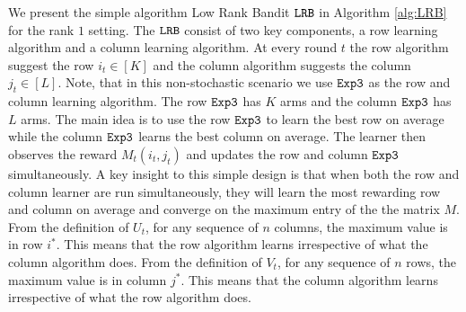 


%

We present the simple  algorithm Low Rank Bandit ${\tt LRB}$  in Algorithm \ref{alg:LRB} for the rank $1$ setting. The ${\tt LRB}$ consist of two key components, a row learning algorithm and a column learning algorithm. At every round $t$ the row algorithm suggest the row $i_t \in [K]$ and the column algorithm suggests the column $j_t\in [L]$. Note, that in this non-stochastic scenario we use ${\tt Exp3}$ as the row and column learning algorithm. The row ${\tt Exp3}$ has $K$ arms and the column ${\tt Exp3}$ has $L$ arms. The main idea is to use the row ${\tt Exp3}$ to learn the best row on average while the column ${\tt Exp3}$ learns the best column on average. The learner then observes the reward $M_t(i_t, j_t)$ and updates the row and column ${\tt Exp3}$ simultaneously. A key insight to this simple design is that when both the row and column learner are run simultaneously, they will learn the most rewarding row and column on average and converge on the maximum entry of the the matrix $M$. From the definition of $U_t$, for any sequence of $n$ columns, the maximum value is in row $i^\ast$.  This means that the row algorithm learns irrespective of what the column algorithm does. From the definition of $V_t$, for any sequence of $n$ rows, the maximum value is in column $j^\ast$.  This means that the column algorithm learns irrespective of what the row algorithm does.

